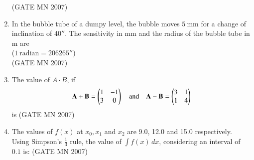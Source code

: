 \documentclass[journal]{IEEEtran}
\begin{document}
\begin{enumerate}
\hfill (GATE MN 2007)
\begin{enumerate}
\end{enumerate}


\item In the bubble tube of a dumpy level, the bubble moves $5 \ \mathrm{mm}$ for a change of inclination of $40''$. The sensitivity in mm and the radius of the bubble tube in m are \\
($1 \ \mathrm{radian} = 206265''$) \\
\hfill (GATE MN 2007)
\begin{enumerate}
\end{enumerate}


\item The value of $A \cdot B$, if 
\[
\mathbf{A+B}=\begin{pmatrix}1 & -1 \\ 3 & 0\end{pmatrix}
\quad \text{and} \quad
\mathbf{A-B}= \begin{pmatrix} 3 & 1 \\ 1 & 4 \end{pmatrix}
\]
is
\hfill (GATE MN 2007)
\begin{enumerate}
\end{enumerate}


\item The values of $f(x)$ at $x_0, x_1$ and $x_2$ are 9.0, 12.0 and 15.0 respectively. Using Simpson's $\frac{1}{3}$ rule, the value of $\int f(x) \, dx$, considering an interval of $0.1$ is:
	\hfill (GATE MN 2007)
\begin{enumerate}
\end{enumerate}



\end{enumerate}
\end{document}
